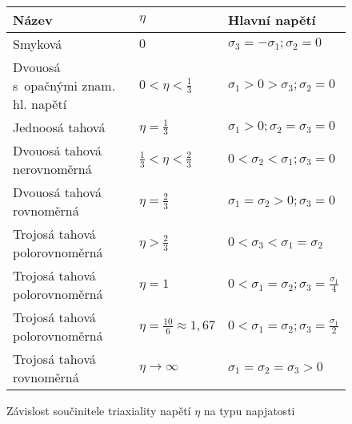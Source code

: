 \begin{figure}[H]\centering\begin{tabular}{lll}\toprule
	Název & $\eta$ & Hlavní napětí\\ \midrule
	Smyková & $0$ & $\sigma_3 = -\sigma_1; \sigma_2 = 0$\\
	Dvouosá s~opačnými znam. hl. napětí & $0< \eta < \tfrac{1}{3}$ & $\sigma_1 > 0 >\sigma_3; \sigma_2 = 0$\\
	Jednoosá tahová & $\eta = \tfrac{1}{3}$ & $\sigma_1 > 0; \sigma_2 = \sigma_3 = 0$\\
	Dvouosá tahová nerovnoměrná & $\tfrac{1}{3} < \eta < \tfrac{2}{3}$ & $0 < \sigma_2 < \sigma_1; \sigma_3 = 0$\\
	Dvouosá tahová rovnoměrná & $\eta = \tfrac{2}{3}$ & $\sigma_1 = \sigma_2 > 0; \sigma_3 = 0$\\
	Trojosá tahová polorovnoměrná & $\eta > \tfrac{2}{3}$ & $0 < \sigma_3 < \sigma_1 = \sigma_2$\\
	Trojosá tahová polorovnoměrná & $\eta = 1$ & $0 < \sigma_1 = \sigma_2; \sigma_3 = \tfrac{\sigma_1}{4}$\\
	Trojosá tahová polorovnoměrná & $\eta = \tfrac{10}{6} \approx 1\!,67$ & $0 < \sigma_1 = \sigma_2; \sigma_3 = \tfrac{\sigma_1}{2}$\\
	Trojosá tahová rovnoměrná & $\eta \rightarrow \infty$ & $\sigma_1 = \sigma_2 = \sigma_3 > 0$\\
\bottomrule\end{tabular}
\caption{Závislost součinitele triaxiality napětí $\eta$ na typu napjatosti}
\end{figure}

